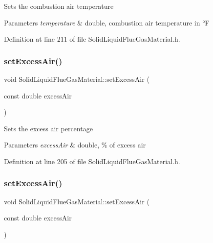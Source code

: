 Sets the combustion air temperature 
\begin{DoxyParams}{Parameters}
{\em temperature} & double, combustion air temperature in °F \\
\hline
\end{DoxyParams}


Definition at line 211 of file Solid\+Liquid\+Flue\+Gas\+Material.\+h.

\mbox{\label{class_solid_liquid_flue_gas_material_a7a3f9f77d267afc05f5fde1da9329ec5}} 
\subsubsection{\texorpdfstring{set\+Excess\+Air()}{setExcessAir()}\hspace{0.1cm}{\footnotesize\ttfamily [1/3]}}
{\footnotesize\ttfamily void Solid\+Liquid\+Flue\+Gas\+Material\+::set\+Excess\+Air (\begin{DoxyParamCaption}\item[{const double}]{excess\+Air }\end{DoxyParamCaption})\hspace{0.3cm}{\ttfamily [inline]}}

Sets the excess air percentage 
\begin{DoxyParams}{Parameters}
{\em excess\+Air} & double, \% of excess air \\
\hline
\end{DoxyParams}


Definition at line 205 of file Solid\+Liquid\+Flue\+Gas\+Material.\+h.

\mbox{\label{class_solid_liquid_flue_gas_material_a7a3f9f77d267afc05f5fde1da9329ec5}} 
\subsubsection{\texorpdfstring{set\+Excess\+Air()}{setExcessAir()}\hspace{0.1cm}{\footnotesize\ttfamily [2/3]}}
{\footnotesize\ttfamily void Solid\+Liquid\+Flue\+Gas\+Material\+::set\+Excess\+Air (\begin{DoxyParamCaption}\item[{const double}]{excess\+Air }\end{DoxyParamCaption})\hspace{0.3cm}{\ttfamily [inline]}}


